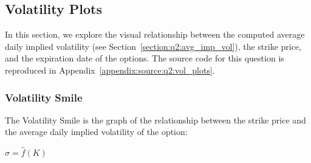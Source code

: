 \documentclass[10pt]{article}
\begin{document}
    \newpage
    \subsection{Volatility Plots}
    
    In this section, we explore the visual relationship between the computed average daily implied volatility (see Section~\ref{section:q2:avg_imp_vol}), the strike price, and the expiration date of the options. The source code for this question is reproduced in Appendix~\ref{appendix:source:q2:vol_plots}.

        \subsubsection{Volatility Smile}
        
        The Volatility Smile is the graph of the relationship between the strike price and the average daily implied volatility of the option:
        
        \begin{center}
            $\hat{\sigma} = \hat{f}(K)$
        \end{center}
\end{document}
